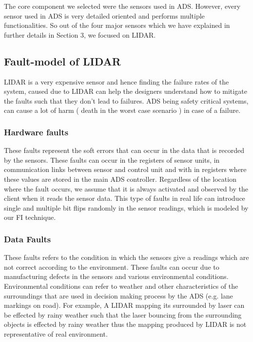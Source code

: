  The core component we selected were the  sensors used in ADS. However, every sensor used in ADS is very detailed oriented and performs multiple functionalities. So out of the four major sensors which we have explained in further details in Section 3, we focused on LIDAR. 
 
 \subsection{Fault-model of LIDAR}
 LIDAR is a very expensive sensor and hence finding the failure rates of the system, caused due to LIDAR can help the designers understand how to mitigate the faults such that they don't lead to failures. ADS being safety critical systems, can cause a lot of harm ( death in the worst case scenario ) in case of a failure. 
 
 \subsubsection{Hardware faults} These faults represent the soft errors that can occur in the data that is recorded by the sensors. These faults can occur in the registers of sensor units, in communication links between sensor and control unit and with in registers where these values are stored in the main ADS controller. Regardless of the location where the fault occurs, we assume that it is always activated and observed by the client when it reads the sensor data. This type of faults in real life can introduce single and multiple bit flips randomly in the sensor readings, which is modeled by our FI technique.
 
 \subsubsection{Data Faults} These faults refers to the condition in which the sensors give a readings which are not correct according to the environment. These faults can occur due to manufacturing defects in the sensors and various environmental conditions. Environmental conditions can refer to weather and other characteristics of the surroundings that are used in decision making process by the ADS (e.g. lane markings on road). For example, A LIDAR mapping its surrounded by laser can be effected by rainy weather such that the laser bouncing from the surrounding objects is effected by rainy weather thus the mapping produced by LIDAR is not representative of real environment.
 
